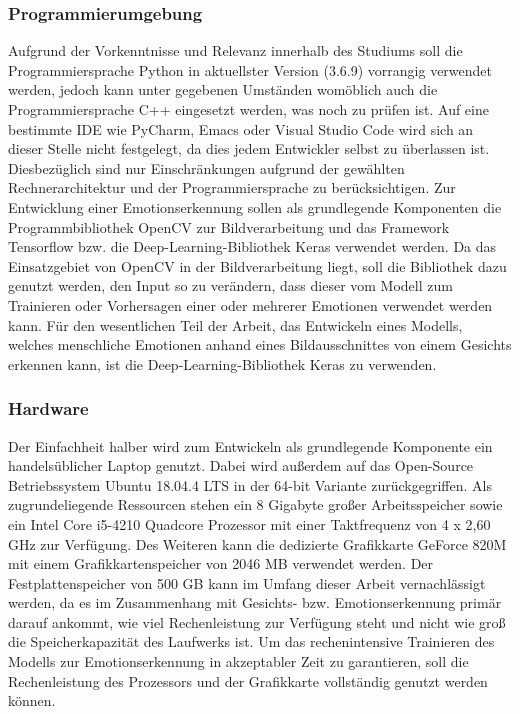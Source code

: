 \documentclass[12pt, a4paper]{report}
\begin{document}
\subsubsection{Programmierumgebung}
Aufgrund der Vorkenntnisse und Relevanz innerhalb des Studiums soll die Programmiersprache Python in aktuellster Version (3.6.9) vorrangig verwendet werden, jedoch kann unter gegebenen Umständen womöblich auch die Programmiersprache C++ eingesetzt werden, was noch zu prüfen ist. Auf eine bestimmte IDE wie PyCharm, Emacs oder Visual Studio Code wird sich an dieser Stelle nicht festgelegt, da dies jedem Entwickler selbst zu überlassen ist. Diesbezüglich sind nur Einschränkungen aufgrund der gewählten Rechnerarchitektur und der Programmiersprache zu berücksichtigen.\newline
Zur Entwicklung einer Emotionserkennung sollen als grundlegende Komponenten die Programmbibliothek OpenCV zur Bildverarbeitung und das Framework Tensorflow bzw. die Deep-Learning-Bibliothek Keras verwendet werden. Da das Einsatzgebiet von OpenCV in der Bildverarbeitung liegt, soll die Bibliothek dazu genutzt werden, den Input so zu verändern, dass dieser vom Modell zum Trainieren oder Vorhersagen einer oder mehrerer Emotionen verwendet werden kann. Für den wesentlichen Teil der Arbeit, das Entwickeln eines Modells, welches menschliche Emotionen anhand eines Bildausschnittes von einem Gesichts erkennen kann, ist die Deep-Learning-Bibliothek Keras zu verwenden.

\subsubsection{Hardware}
Der Einfachheit halber wird zum Entwickeln als grundlegende Komponente ein handelsüblicher Laptop genutzt. Dabei wird außerdem auf das Open-Source Betriebssystem Ubuntu 18.04.4 LTS in der 64-bit Variante zurückgegriffen. Als zugrundeliegende Ressourcen stehen ein 8 Gigabyte großer Arbeitsspeicher sowie ein Intel Core i5-4210 Quadcore Prozessor mit einer Taktfrequenz von 4 x 2,60 GHz zur Verfügung. Des Weiteren kann die dedizierte Grafikkarte GeForce 820M mit einem Grafikkartenspeicher von 2046 MB verwendet werden. Der Festplattenspeicher von 500 GB kann im Umfang dieser Arbeit vernachlässigt werden, da es im Zusammenhang mit Gesichts- bzw. Emotionserkennung primär darauf ankommt, wie viel Rechenleistung zur Verfügung steht und nicht wie groß die Speicherkapazität des Laufwerks ist. Um das rechenintensive Trainieren des Modells zur Emotionserkennung in akzeptabler Zeit zu garantieren, soll die Rechenleistung des Prozessors und der Grafikkarte vollständig genutzt werden können.
\end{document}
